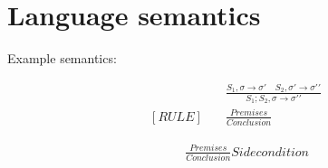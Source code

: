 \chapter{Language semantics}\label{cha:languagesemantics}

Example semantics:

\begin{align*}
    [COMPOSITION] \quad &
    \frac
    {S_1, \sigma \rightarrow \sigma \prime \quad S_2, \sigma \prime \rightarrow \sigma \prime \prime}
    {S_1;S_2, \sigma \rightarrow \sigma \prime \prime}
    \\
    [RULE]     \quad    &
    \frac
    {Premises}
    {Conclusion}
\end{align*}

\begin{align*}
    [RULE]     \quad &
    \frac
    {Premises}
    {Conclusion}
    Side condition
\end{align*}